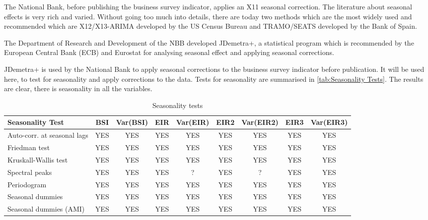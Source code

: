 \documentclass[12pt,a4paper,oneside]{book}
\begin{document}
The National Bank, before publishing the business survey indicator, applies an X11 seasonal correction.
The literature about seasonal effects is very rich and varied. Without going too much into details, there are today two methods which are the most widely used and recommended which are X12/X13-ARIMA developed by the US Census Bureau and TRAMO/SEATS developed by the Bank of Spain. 

The Department of Research and Development of the NBB developed JDemetra+, a statistical program which is recommended by the European Central Bank (ECB) and Eurostat for analysing seasonal effect and applying seasonal corrections. 

JDemetra+ is used by the National Bank to apply seasonal corrections to the business survey indicator before publication. It will be used here, to test for seasonality and apply corrections to the data.
Tests for seasonality are summarised in \autoref{tab:Seasonality Tests}. The results are clear, there is seasonality in all the variables.


\begin{table}[htp!]
    \caption{Seasonality tests}
    \label{tab:Seasonality Tests}
    \centering \scriptsize 
    \begin{tabular}{l|c|c|c|c|c|c|c|c}
\footnotesize \textbf{Seasonality Test} & BSI & Var(BSI) & EIR & Var(EIR) & EIR2 & Var(EIR2) & EIR3 & Var(EIR3) \\ \hline
\footnotesize Auto-corr. at seasonal lags& YES & YES & YES & YES & YES & YES & YES & YES \\
\footnotesize Friedman test & YES   & YES & YES & YES & YES & YES & YES & YES \\
\footnotesize Kruskall-Wallis test & YES   & YES & YES & YES & YES & YES & YES & YES \\
\footnotesize Spectral peaks & YES   & YES & YES & ? & YES & ? & YES & YES \\
\footnotesize Periodogram & YES   & YES & YES & YES & YES & YES & YES & YES \\
\footnotesize Seasonal dummies & YES   & YES & YES & YES & YES & YES & YES & YES \\
\footnotesize Seasonal dummies (AMI) & YES   & YES & YES & YES & YES & YES & YES & YES \\
    \end{tabular}
\end{table}


\end{document}
